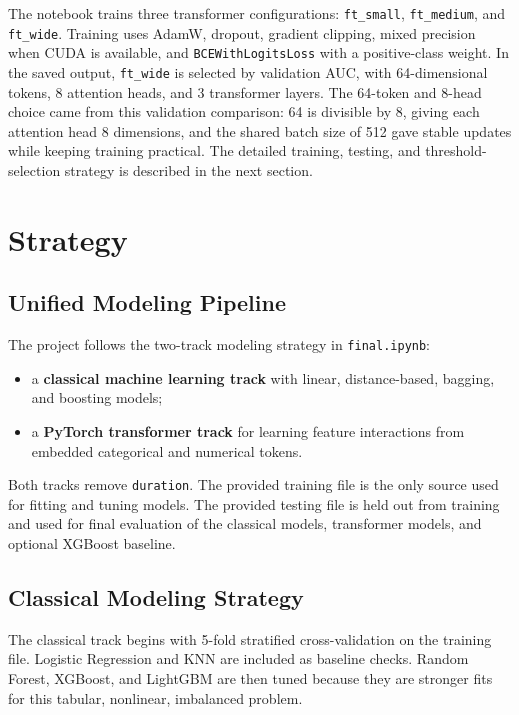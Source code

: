 \documentclass[10pt,twocolumn]{article}
\begin{document}
The notebook trains three transformer configurations: \texttt{ft\_small}, \texttt{ft\_medium}, and \texttt{ft\_wide}. Training uses AdamW, dropout, gradient clipping, mixed precision when CUDA is available, and \texttt{BCEWithLogitsLoss} with a positive-class weight. In the saved output, \texttt{ft\_wide} is selected by validation AUC, with 64-dimensional tokens, 8 attention heads, and 3 transformer layers. The 64-token and 8-head choice came from this validation comparison: 64 is divisible by 8, giving each attention head 8 dimensions, and the shared batch size of 512 gave stable updates while keeping training practical. The detailed training, testing, and threshold-selection strategy is described in the next section.

\section{Strategy}

\subsection{Unified Modeling Pipeline}

The project follows the two-track modeling strategy in \texttt{final.ipynb}:

\begin{itemize}
  \item a \textbf{classical machine learning track} with linear, distance-based, bagging, and boosting models;
  \item a \textbf{PyTorch transformer track} for learning feature interactions from embedded categorical and numerical tokens.
\end{itemize}

Both tracks remove \texttt{duration}. The provided training file is the only source used for fitting and tuning models. The provided testing file is held out from training and used for final evaluation of the classical models, transformer models, and optional XGBoost baseline.

\subsection{Classical Modeling Strategy}

The classical track begins with 5-fold stratified cross-validation on the training file. Logistic Regression and KNN are included as baseline checks. Random Forest, XGBoost, and LightGBM are then tuned because they are stronger fits for this tabular, nonlinear, imbalanced problem.
\end{document}
